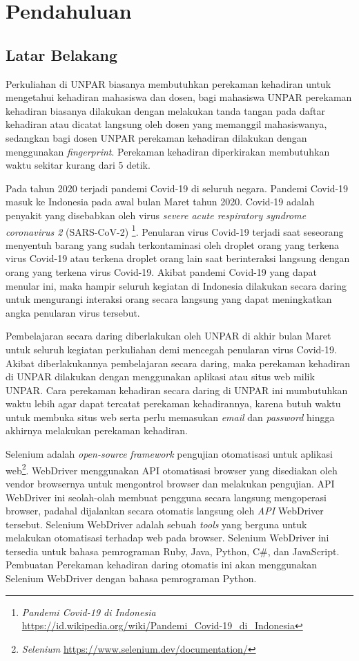 \chapter{Pendahuluan}
\label{chap:intro}
   
\section{Latar Belakang}
\label{sec:label}
Perkuliahan di UNPAR biasanya membutuhkan perekaman kehadiran untuk mengetahui kehadiran mahasiswa dan dosen, bagi mahasiswa UNPAR perekaman kehadiran biasanya dilakukan dengan melakukan tanda tangan pada daftar kehadiran atau dicatat langsung oleh dosen yang memanggil mahasiswanya, sedangkan bagi dosen UNPAR perekaman kehadiran dilakukan dengan menggunakan  \textit{fingerprint}. Perekaman kehadiran diperkirakan membutuhkan waktu sekitar kurang dari 5 detik.

Pada tahun 2020 terjadi pandemi Covid-19 di seluruh negara. Pandemi Covid-19 masuk ke Indonesia pada awal bulan Maret tahun 2020. Covid-19 adalah penyakit yang disebabkan oleh virus \textit{severe acute respiratory syndrome coronavirus 2} (SARS-CoV-2) \footnote{\textit{Pandemi Covid-19 di Indonesia} \url{https://id.wikipedia.org/wiki/Pandemi_Covid-19_di_Indonesia}}. Penularan virus Covid-19 terjadi saat seseorang menyentuh barang yang sudah terkontaminasi oleh droplet orang yang terkena virus Covid-19 atau terkena droplet orang lain saat berinteraksi langsung dengan orang yang terkena virus Covid-19.  Akibat pandemi Covid-19 yang dapat menular ini, maka hampir seluruh kegiatan di Indonesia dilakukan secara daring untuk mengurangi interaksi orang secara langsung yang dapat meningkatkan angka penularan virus tersebut. 

Pembelajaran secara daring diberlakukan oleh UNPAR di akhir bulan Maret untuk seluruh kegiatan perkuliahan demi mencegah penularan virus Covid-19. Akibat diberlakukannya pembelajaran secara daring, maka perekaman kehadiran di UNPAR dilakukan dengan menggunakan aplikasi atau situs web milik UNPAR. Cara perekaman kehadiran secara daring di UNPAR ini mumbutuhkan waktu lebih agar dapat tercatat perekaman kehadirannya, karena butuh waktu untuk membuka situs web serta perlu memasukan \textit{email} dan \textit{password} hingga akhirnya melakukan perekaman kehadiran. 

Selenium adalah \textit{open-source} \textit{framework} pengujian otomatisasi untuk aplikasi web\footnote{\textit{Selenium} \url{https://www.selenium.dev/documentation/}}. WebDriver menggunakan API otomatisasi browser yang disediakan oleh vendor browsernya untuk mengontrol browser dan melakukan pengujian. API WebDriver ini seolah-olah membuat pengguna secara langsung mengoperasi browser, padahal dijalankan secara otomatis langsung oleh \textit{API} WebDriver tersebut. Selenium WebDriver adalah sebuah \textit{tools} yang berguna untuk melakukan otomatisasi terhadap web pada browser. Selenium WebDriver ini tersedia untuk bahasa pemrograman Ruby, Java, Python, C\#, dan JavaScript. Pembuatan Perekaman kehadiran daring otomatis ini akan menggunakan Selenium WebDriver dengan bahasa pemrograman Python.  

